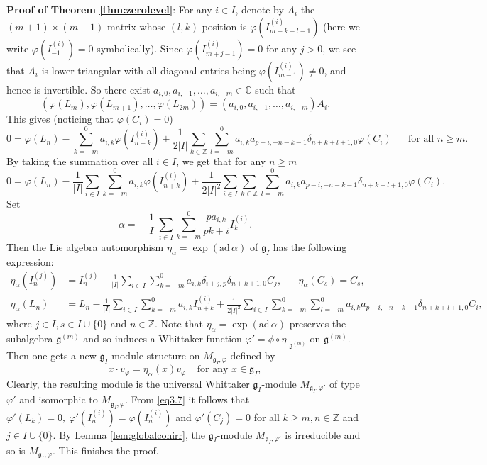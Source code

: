 \documentclass[12pt, reqno]{amsart}
\numberwithin{equation}{section}
\numberwithin{equation}{section}
\def\al{\alpha}
\def\dt{\delta}
\def\g{\mathfrak{g}}
\def\vf{\varphi}
\def\vvf{v_{\vf}}
\def\gi{\g_I}
\def\mgivf{M_{\gi,\vf}}
\newcommand{\C}{\mathbb C}
\newcommand{\Z}{\mathbb{Z}}
\newcommand{\elei}[2]{I_{#1}^{(#2)}}
\newcommand{\vfi}[2]{\vf\left(I_{#1}^{(#2)}\right)}
\newcommand{\vfl}[1]{\vf(L_{#1})}
\begin{document}
\textbf{Proof of Theorem \ref{thm:zerolevel}}:
 For any $i\in I$, denote by $A_i$ the $(m+1)\times (m+1)$-matrix  whose  $(l,k)$-position is $\vfi{m+k-l-1}i$ (here we write $\vfi{-1}i=0$ symbolically).
 Since $\vf(\elei {m+j-1}i)=0$ for any $j>0$, we see that $A_i$ is lower triangular with all diagonal entries being $\vfi{m-1}i\neq0$, and hence is invertible.
 So there exist $a_{i,0},a_{i,-1},\dots,a_{i,-m}\in\C$ such that
 $$\left(\vfl m,\vfl{m+1},\dots,\vfl{2m}\right)=(a_{i,0},a_{i,-1},\dots,a_{i,-m})A_i.$$
 This gives (noticing that $\vf(C_i)=0$)
 \begin{equation*}
  0=\vfl n-\sum_{k=-m}^0a_{i,k}\vfi{n+k}i
    +\frac1{2| I|}\sum_{k\in\Z}\sum_{l=-m}^0a_{i,k}a_{p-i,-n-k-1}\dt_{n+k+l+1,0}\vf(C_i)
  \ \ \ \quad \text{for all }n\geq m.
 \end{equation*}
By taking the summation over all $i\in I$, we get that for any $n\geq m$
 \begin{equation}\label{eq3.7}
  0=\vfl n-\frac1{| I|}\sum_{i\in I}\sum_{k=-m}^0a_{i,k}\vfi{n+k}i+
    \frac1{2| I|^2}\sum_{i\in I}\sum_{k\in\Z}\sum_{l=-m}^0a_{i,k}a_{p-i,-n-k-1}\dt_{n+k+l+1,0}\vf(C_i).
 \end{equation}
 Set
 $$\al=-\frac1{| I|}\sum_{i\in I}\sum_{k=-m}^0\frac{pa_{i,k}}{pk+i}\elei ki.$$
 Then the Lie algebra automorphism $\eta_\al=\exp(\text{ad}\, \al)$ of $\g_I$ has the following expression:
 \begin{align*}
  \eta_\al(\elei nj)&=\elei nj-\frac1{| I|}\sum_{i\in I}\sum_{k=-m}^0a_{i,k}\dt_{i+j,p}\dt_{n+k+1,0}C_j,\ \ \
      \quad \eta_\al(C_s)=C_s,\\
  \eta_\al(L_n)&=L_n-\frac1{| I|}\sum_{i\in I}\sum_{k=-m}^0a_{i,k}\elei {n+k}i
             +\frac1{2| I|^2}\sum_{i\in I}\sum_{k=-m}^0\sum_{l=-m}^0a_{i,k}a_{p-i,-n-k-1}\dt_{n+k+l+1,0}C_i,
 \end{align*}
 where $j\in I, s\in I\cup\{0\}$ and $n\in\Z$.
 Note that $\eta_\al=\exp(\text{ad}\, \al)$ preserves the subalgebra $
 \g^{(m)}$ and so induces a Whittaker function $\varphi'=\phi\circ \eta|_{\g^{(m)}}$ on $\g^{(m)}$.
 Then one gets a new $\g_I$-module structure on $\mgivf$ defined by
 $$x\cdot\vvf=\eta_\al(x)\vvf\ \ \ \ \ \text{for any }x\in\gi,$$
 Clearly, the resulting module is the universal Whittaker $\g_I$-module $M_{\gi,\vf'}$ of type $\vf'$ and isomorphic to $\mgivf$.
 From \eqref{eq3.7} it follows that $\varphi'(L_k)=0,\ \varphi'(\elei ni)=\varphi(\elei ni)$ and $\varphi'(C_j)=0$ for all $k\geq m, n\in\Z$ and $j\in I\cup\{0\}$.
By Lemma \ref{lem:globalconirr}, the $\g_I$-module $M_{\gi,\vf'}$ is irreducible and so is $M_{\g_I,\varphi}$. This finishes the proof.
\end{document}
